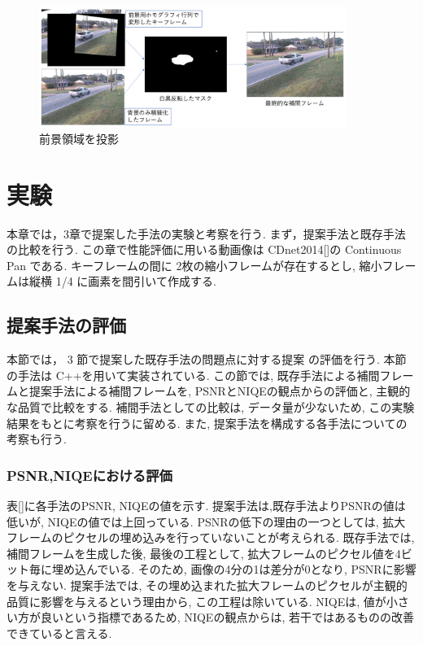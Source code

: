 \documentclass[a4paper,12pt]{jsreport}
\begin{document}
\begin{figure}[h]
  \begin{center}
    \includegraphics[width=10cm]{./teian_3_2.png}
    \caption{前景領域を投影}
  \end{center}
\end{figure}


\chapter{実験} 
本章では，3章で提案した手法の実験と考察を行う. まず，提案手法と既存手法の比較を行う. この章で性能評価に用いる動画像は CDnet2014[]の Continuous Pan である. キーフレームの間に 2枚の縮小フレームが存在するとし, 縮小フレームは縦横 1/4 に画素を間引いて作成する.

\section{提案手法の評価}
本節では， 3 節で提案した既存手法の問題点に対する提案 の評価を行う. 本節の手法は C++を用いて実装されている. この節では, 既存手法による補間フレームと提案手法による補間フレームを, PSNRとNIQEの観点からの評価と, 主観的な品質で比較をする. 補間手法としての比較は, データ量が少ないため, この実験結果をもとに考察を行うに留める. また, 提案手法を構成する各手法についての考察も行う. 

\subsection{PSNR,NIQEにおける評価}
表[]に各手法のPSNR, NIQEの値を示す. 提案手法は,既存手法よりPSNRの値は低いが, NIQEの値では上回っている. PSNRの低下の理由の一つとしては, 拡大フレームのピクセルの埋め込みを行っていないことが考えられる. 既存手法では, 補間フレームを生成した後, 最後の工程として, 拡大フレームのピクセル値を4ビット毎に埋め込んでいる. そのため, 画像の4分の1は差分が0となり, PSNRに影響を与えない. 提案手法では, その埋め込まれた拡大フレームのピクセルが主観的品質に影響を与えるという理由から, この工程は除いている. 
NIQEは, 値が小さい方が良いという指標であるため, NIQEの観点からは, 若干ではあるものの改善できていると言える. 
\end{document}

